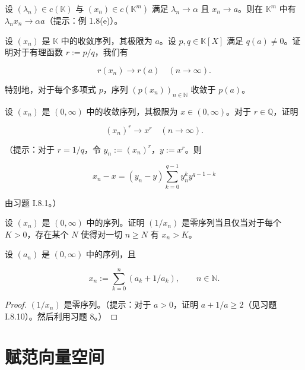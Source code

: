 \begin{exercises}
\begin{items}
\item

设 $(\lambda_n) \in c(\mathbb{K})$ 与 $(x_n) \in c(\mathbb{K}^m)$ 满足 $\lambda_n \to \alpha$ 且 $x_n \to a$。则在 $\mathbb{K}^m$ 中有 $\lambda_nx_n \to \alpha a$（提示：例 1.8(e)）。

\end{items}

\item

设 $ (x_n) $ 是 $ \mathbb{K} $ 中的收敛序列，其极限为 $ a $。设 $ p, q \in \mathbb{K}[X] $ 满足 $ q(a) \neq 0 $。证明对于有理函数 $ r := p/q $，我们有

\[
r(x_{n})\to r(a)\quad(n\to\infty).
\]

特别地，对于每个多项式 $p$，序列 $(p(x_n))_{n\in\mathbb{N}}$ 收敛于 $p(a)$。

\item

设 $ (x_n) $ 是 $ (0, \infty) $ 中的收敛序列，其极限为 $ x \in (0, \infty) $。对于 $ r \in \mathbb{Q} $，证明

\[
\left(x_{n}\right)^{r}\to x^{r}\quad(n\to\infty).
\]

（提示：对于 $r = 1/q$，令 $y_n := (x_n)^r$，$y := x^r$。则

\[
x_{n}-x=\left(y_{n}-y\right)\sum_{k=0}^{q-1}y_{n}^{k}y^{q-1-k}
\]

由习题 I.8.1。）

\item

设 $ (x_n) $ 是 $ (0, \infty) $ 中的序列。证明 $ (1/x_n) $ 是零序列当且仅当对于每个 $ K > 0 $，存在某个 $ N $ 使得对一切 $ n \geq N $ 有 $ x_n > K $。

\item

设 $ (a_{n}) $ 是 $ (0, \infty) $ 中的序列，且

\[
x_{n}:=\sum_{k=0}^{n}(a_{k}+1/a_{k}),\qquad n\in\mathbb{N}.
\]
\end{exercises}

\begin{proof}

$ (1/x_n) $ 是零序列。（提示：对于 $ a > 0 $，证明 $ a + 1/a \geq 2 $（见习题 I.8.10）。然后利用习题 8。）

\end{proof}

\section{赋范向量空间}


